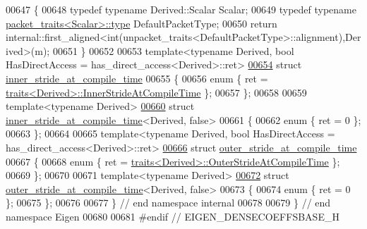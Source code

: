 \begin{DoxyCode}
00647 \{
00648   \textcolor{keyword}{typedef} \textcolor{keyword}{typename} Derived::Scalar Scalar;
00649   \textcolor{keyword}{typedef} \textcolor{keyword}{typename} \hyperlink{struct_eigen_1_1internal_1_1packet__traits}{packet\_traits<Scalar>::type} DefaultPacketType;
00650   \textcolor{keywordflow}{return} internal::first\_aligned<int(unpacket\_traits<DefaultPacketType>::alignment),Derived>(m);
00651 \}
00652 
00653 template<typename Derived, bool HasDirectAccess = has\_direct\_access<Derived>::ret>
\hyperlink{struct_eigen_1_1internal_1_1inner__stride__at__compile__time}{00654} \textcolor{keyword}{struct }\hyperlink{struct_eigen_1_1internal_1_1inner__stride__at__compile__time}{inner\_stride\_at\_compile\_time}
00655 \{
00656   \textcolor{keyword}{enum} \{ ret = \hyperlink{struct_eigen_1_1internal_1_1traits}{traits<Derived>::InnerStrideAtCompileTime} \};
00657 \};
00658 
00659 \textcolor{keyword}{template}<\textcolor{keyword}{typename} Derived>
\hyperlink{struct_eigen_1_1internal_1_1inner__stride__at__compile__time_3_01_derived_00_01false_01_4}{00660} \textcolor{keyword}{struct }\hyperlink{struct_eigen_1_1internal_1_1inner__stride__at__compile__time}{inner\_stride\_at\_compile\_time}<Derived, false>
00661 \{
00662   \textcolor{keyword}{enum} \{ ret = 0 \};
00663 \};
00664 
00665 template<typename Derived, bool HasDirectAccess = has\_direct\_access<Derived>::ret>
\hyperlink{struct_eigen_1_1internal_1_1outer__stride__at__compile__time}{00666} \textcolor{keyword}{struct }\hyperlink{struct_eigen_1_1internal_1_1outer__stride__at__compile__time}{outer\_stride\_at\_compile\_time}
00667 \{
00668   \textcolor{keyword}{enum} \{ ret = \hyperlink{struct_eigen_1_1internal_1_1traits}{traits<Derived>::OuterStrideAtCompileTime} \};
00669 \};
00670 
00671 \textcolor{keyword}{template}<\textcolor{keyword}{typename} Derived>
\hyperlink{struct_eigen_1_1internal_1_1outer__stride__at__compile__time_3_01_derived_00_01false_01_4}{00672} \textcolor{keyword}{struct }\hyperlink{struct_eigen_1_1internal_1_1outer__stride__at__compile__time}{outer\_stride\_at\_compile\_time}<Derived, false>
00673 \{
00674   \textcolor{keyword}{enum} \{ ret = 0 \};
00675 \};
00676 
00677 \} \textcolor{comment}{// end namespace internal}
00678 
00679 \} \textcolor{comment}{// end namespace Eigen}
00680 
00681 \textcolor{preprocessor}{#endif // EIGEN\_DENSECOEFFSBASE\_H}
\end{DoxyCode}
